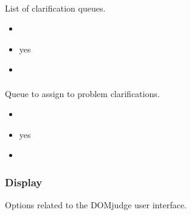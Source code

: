 \documentclass[a4paper,10pt,english,openany]{sphinxmanual}
\begin{document}
\paragraph{}
\label{\detokenize{configuration-reference:clar-queues}}
\sphinxAtStartPar
List of clarification queues.
\begin{itemize}
\item {} 
\sphinxAtStartPar
{} 

\item {} 
\sphinxAtStartPar
{} yes

\item {} 
\sphinxAtStartPar
{}

\begin{sphinxVerbatim}[commandchars=\\\{\}]
\end{sphinxVerbatim}

\end{itemize}


\paragraph{}
\label{\detokenize{configuration-reference:clar-default-problem-queue}}
\sphinxAtStartPar
Queue to assign to problem clarifications.
\begin{itemize}
\item {} 
\sphinxAtStartPar
{} 

\item {} 
\sphinxAtStartPar
{} yes

\item {} 
\sphinxAtStartPar
{} \sphinxcode{\sphinxupquote{\textquotesingle{}\textquotesingle{}}}

\end{itemize}


\subsubsection{Display}
\label{\detokenize{configuration-reference:display}}
\sphinxAtStartPar
Options related to the DOMjudge user interface.
\end{document}
